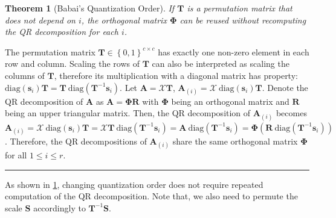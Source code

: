 \documentclass{article} %
\newcommand{\BlackBox}{\rule{1.5ex}{1.5ex}}  %
\renewenvironment{proof}{\par\noindent{\bf Proof\ }}{\hfill\BlackBox\par}
\newenvironment{proof}{\par\noindent{\bf Proof\ }}{\hfill\BlackBox\par}
\newtheorem{theorem}{Theorem}
\begin{document}
\begin{theorem}[Babai's Quantization Order]
\label{thm:babai_permute}
If $\bm{T}$ is a permutation matrix that does not depend on $i$, the orthogonal matrix $\bm{\Phi}$ can be reused without recomputing the QR decomposition for each $i$.
\end{theorem}
\begin{proof}
The permutation matrix $\bm{T} \in \left\{ 0 , 1 \right\}^{c \times c}$ has exactly one non-zero element in each row and column. Scaling the rows of $\bm{T}$ can also be interpreted as scaling the columns of $\bm{T}$, therefore its multiplication with a diagonal matrix has property: $\mathrm{diag} \left( \bm{s}_{i} \right) \bm{T} = \bm{T} \mathrm{\ diag} \left( \bm{T}^{-1} \bm{s}_{i} \right)$.
Let $\bm{A} = \bm{\mathcal{X}} \bm{T}$, $\bm{A}_{(i)} = \bm{\mathcal{X}} \mathrm{\ diag} \left( \bm{s}_{i} \right) \bm{T}$. Denote the QR decomposition of $\bm{A}$ as $\bm{A} = \bm{\Phi} \bm{R}$ with $\bm{\Phi}$ being an orthogonal matrix and $\bm{R}$ being an upper triangular matrix. Then, the QR decomposition of $\bm{A}_{(i)}$ becomes
$\bm{A}_{(i)} = \bm{\mathcal{X}} \mathrm{\ diag} \left( \bm{s}_{i} \right) \bm{T} = \bm{\mathcal{X}} \bm{T} \mathrm{\ diag} \left( \bm{T}^{-1} \bm{s}_{i} \right) = \bm{A} \mathrm{\ diag} \left( \bm{T}^{-1} \bm{s}_{i} \right) = \bm{\Phi} \left( \bm{R} \mathrm{\ diag} \left( \bm{T}^{-1} \bm{s}_{i} \right) \right)$.
Therefore, the QR decompositions of $\bm{A}_{(i)}$ share the same orthogonal matrix $\bm{\Phi}$ for all $1 \le i \le r$.
\end{proof}

As shown in \cref{thm:babai_permute}, changing quantization order does not require repeated computation of the QR decomposition. Note that, we also need to permute the scale $\bm{S}$ accordingly to $\bm{T}^{-1} \bm{S}$.
\end{document}
